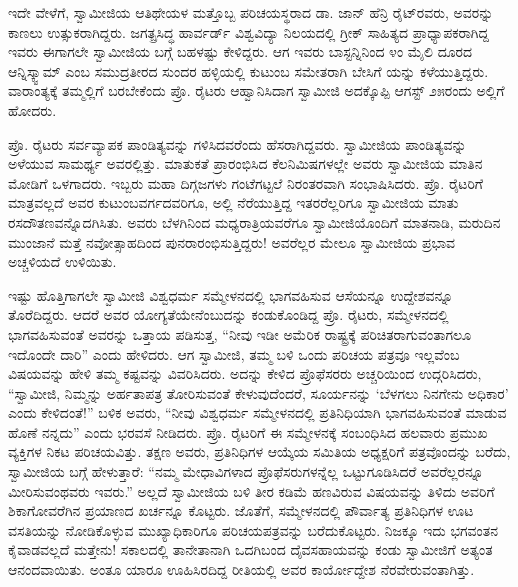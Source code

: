 ಇದೇ ವೇಳೆಗೆ, ಸ್ವಾಮೀಜಿಯ ಆತಿಥೇಯಳ ಮತ್ತೊಬ್ಬ ಪರಿಚಯಸ್ಥರಾದ ಡಾ. ಜಾನ್ ಹೆನ್ರಿ ರೈಟ್​ರವರು, ಅವರನ್ನು ಕಾಣಲು ಉತ್ಸುಕರಾಗಿದ್ದರು. ಜಗತ್ಪ್ರಸಿದ್ಧ ಹಾರ್ವರ್ಡ್ ವಿಶ್ವವಿದ್ಯಾ ನಿಲಯದಲ್ಲಿ ಗ್ರೀಕ್ ಸಾಹಿತ್ಯದ ಪ್ರಾಧ್ಯಾಪಕರಾಗಿದ್ದ ಇವರು ಈಗಾಗಲೇ ಸ್ವಾಮೀಜಿಯ ಬಗ್ಗೆ ಬಹಳಷ್ಟು ಕೇಳಿದ್ದರು. ಆಗ ಇವರು ಬಾಸ್ಟನ್ನಿನಿಂದ ೪ಂ ಮೈಲಿ ದೂರದ ಆನ್ನಿಸ್ಕ್ವಾಮ್  ಎಂಬ ಸಮುದ್ರತೀರದ ಸುಂದರ ಹಳ್ಳಿಯಲ್ಲಿ ಕುಟುಂಬ ಸಮೇತರಾಗಿ ಬೇಸಿಗೆ ಯನ್ನು ಕಳೆಯುತ್ತಿದ್ದರು. ವಾರಾಂತ್ಯಕ್ಕೆ ತಮ್ಮಲ್ಲಿಗೆ ಬರಬೇಕೆಂದು ಪ್ರೊ. ರೈಟರು ಆಹ್ವಾನಿಸಿದಾಗ ಸ್ವಾಮೀಜಿ ಅದಕ್ಕೊಪ್ಪಿ ಆಗಸ್ಟ್ ೨೫ರಂದು ಅಲ್ಲಿಗೆ ಹೋದರು.

ಪ್ರೊ. ರೈಟರು ಸರ್ವವ್ಯಾಪಕ ಪಾಂಡಿತ್ಯವನ್ನು ಗಳಿಸಿದವರೆಂದು ಹೆಸರಾಗಿದ್ದವರು. ಸ್ವಾಮೀಜಿಯ ಪಾಂಡಿತ್ಯವನ್ನು ಅಳೆಯುವ ಸಾಮರ್ಥ್ಯ ಅವರಲ್ಲಿತ್ತು. ಮಾತುಕತೆ ಪ್ರಾರಂಭಿಸಿದ ಕೆಲನಿಮಿಷಗಳಲ್ಲೇ ಅವರು ಸ್ವಾಮೀಜಿಯ ಮಾತಿನ ಮೋಡಿಗೆ ಒಳಗಾದರು. ಇಬ್ಬರು ಮಹಾ ದಿಗ್ಗಜಗಳು ಗಂಟೆಗಟ್ಟಲೆ ನಿರಂತರವಾಗಿ ಸಂಭಾಷಿಸಿದರು. ಪ್ರೊ. ರೈಟರಿಗೆ ಮಾತ್ರವಲ್ಲದೆ ಅವರ ಕುಟುಂಬವರ್ಗದವರಿಗೂ, ಅಲ್ಲಿ ನೆರೆಯುತ್ತಿದ್ದ ಇತರರೆಲ್ಲರಿಗೂ ಸ್ವಾಮೀಜಿಯ ಮಾತು ರಸದೌತಣವನ್ನೊದಗಿಸಿತು. ಅವರು ಬೆಳಗಿನಿಂದ ಮಧ್ಯರಾತ್ರಿಯವರೆಗೂ ಸ್ವಾಮೀಜಿಯೊಂದಿಗೆ ಮಾತನಾಡಿ, ಮರುದಿನ ಮುಂಜಾನೆ ಮತ್ತೆ ನವೋತ್ಸಾಹದಿಂದ ಪುನರಾರಂಭಿಸುತ್ತಿದ್ದರು! ಅವರೆಲ್ಲರ ಮೇಲೂ ಸ್ವಾಮೀಜಿಯ ಪ್ರಭಾವ ಅಚ್ಚಳಿಯದೆ ಉಳಿಯಿತು.

ಇಷ್ಟು ಹೊತ್ತಿಗಾಗಲೇ ಸ್ವಾಮೀಜಿ ವಿಶ್ವಧರ್ಮ ಸಮ್ಮೇಳನದಲ್ಲಿ ಭಾಗವಹಿಸುವ ಆಸೆಯನ್ನೂ ಉದ್ದೇಶವನ್ನೂ ತೊರೆದಿದ್ದರು. ಆದರೆ ಅವರ ಯೋಗ್ಯತೆಯೇನೆಂಬುದನ್ನು ಕಂಡುಕೊಂಡಿದ್ದ ಪ್ರೊ. ರೈಟರು, ಸಮ್ಮೇಳನದಲ್ಲಿ ಭಾಗವಹಿಸುವಂತೆ ಅವರನ್ನು ಒತ್ತಾಯ ಪಡಿಸುತ್ತ, “ನೀವು ಇಡೀ ಅಮೆರಿಕ ರಾಷ್ಟ್ರಕ್ಕೆ ಪರಿಚಿತರಾಗುವಂತಾಗಲೂ ಇದೊಂದೇ ದಾರಿ” ಎಂದು ಹೇಳಿದರು. ಆಗ ಸ್ವಾಮೀಜಿ, ತಮ್ಮ ಬಳಿ ಒಂದು ಪರಿಚಯ ಪತ್ರವೂ ಇಲ್ಲವೆಂಬ ವಿಷಯವನ್ನು ಹೇಳಿ ತಮ್ಮ ಕಷ್ಟವನ್ನು ವಿವರಿಸಿದರು. ಅದನ್ನು ಕೇಳಿದ ಪ್ರೊಫೆಸರರು ಅಚ್ಚರಿಯಿಂದ ಉದ್ಗರಿಸಿದರು, “ಸ್ವಾಮೀಜಿ, ನಿಮ್ಮನ್ನು ಅರ್ಹತಾಪತ್ರ ತೋರಿಸುವಂತೆ ಕೇಳುವುದೆಂದರೆ, ಸೂರ್ಯನನ್ನು ‘ಬೆಳಗಲು ನಿನಗೇನು ಅಧಿಕಾರ’ ಎಂದು ಕೇಳಿದಂತೆ!” ಬಳಿಕ ಅವರು, “ನೀವು ವಿಶ್ವಧರ್ಮ ಸಮ್ಮೇಳನದಲ್ಲಿ ಪ್ರತಿನಿಧಿಯಾಗಿ ಭಾಗವಹಿಸುವಂತೆ ಮಾಡುವ ಹೊಣೆ ನನ್ನದು” ಎಂದು ಭರವಸೆ ನೀಡಿದರು. ಪ್ರೊ. ರೈಟರಿಗೆ ಈ ಸಮ್ಮೇಳನಕ್ಕೆ ಸಂಬಂಧಿಸಿದ ಹಲವಾರು ಪ್ರಮುಖ ವ್ಯಕ್ತಿಗಳ ನಿಕಟ ಪರಿಚಯವಿತ್ತು. ತಕ್ಷಣ ಅವರು, ಪ್ರತಿನಿಧಿಗಳ ಆಯ್ಕೆಯ ಸಮಿತಿಯ ಅಧ್ಯಕ್ಷರಿಗೆ ಪತ್ರವೊಂದನ್ನು ಬರೆದು, ಸ್ವಾಮೀಜಿಯ ಬಗ್ಗೆ ಹೇಳುತ್ತಾರೆ: “ನಮ್ಮ ಮೇಧಾವಿಗಳಾದ ಪ್ರೊಫೆಸರುಗಳನ್ನೆಲ್ಲ ಒಟ್ಟುಗೂಡಿಸಿದರೆ ಅವರೆಲ್ಲರನ್ನೂ ಮೀರಿಸುವಂಥವರು ಇವರು.” ಅಲ್ಲದೆ ಸ್ವಾಮೀಜಿಯ ಬಳಿ ತೀರ ಕಡಿಮೆ ಹಣವಿರುವ ವಿಷಯವನ್ನು ತಿಳಿದು ಅವರಿಗೆ ಶಿಕಾಗೋವರೆಗಿನ ಪ್ರಯಾಣದ ಖರ್ಚನ್ನೂ ಕೊಟ್ಟರು. ಜೊತೆಗೆ, ಸಮ್ಮೇಳನದಲ್ಲಿ ಪೌರ್ವಾತ್ಯ ಪ್ರತಿನಿಧಿಗಳ ಊಟ ವಸತಿಯನ್ನು ನೋಡಿಕೊಳ್ಳುವ ಮುಖ್ಯಾಧಿಕಾರಿಗೂ ಪರಿಚಯಪತ್ರವನ್ನು ಬರೆದುಕೊಟ್ಟರು. ನಿಜಕ್ಕೂ ಇದು ಭಗವಂತನ ಕೈವಾಡವಲ್ಲದೆ ಮತ್ತೇನು! ಸಕಾಲದಲ್ಲಿ ತಾನೇತಾನಾಗಿ ಒದಗಿಬಂದ ದೈವಸಹಾಯವನ್ನು ಕಂಡು ಸ್ವಾಮೀಜಿಗೆ ಅತ್ಯಂತ ಆನಂದವಾಯಿತು. ಅಂತೂ ಯಾರೂ ಊಹಿಸಿರದಿದ್ದ ರೀತಿಯಲ್ಲಿ ಅವರ ಕಾರ್ಯೋದ್ದೇಶ ನೆರವೇರುವಂತಾಗಿತ್ತು.

